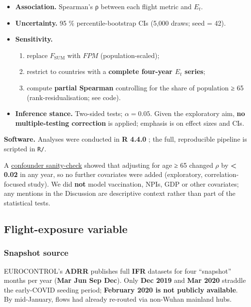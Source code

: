 \documentclass[
  authoryear,
  preprint,
  3p,
  onecolumn]{elsarticle}
\providecommand{\tightlist}{%
  \setlength{\itemsep}{0pt}\setlength{\parskip}{0pt}}\usepackage{longtable,booktabs,array}
\begin{document}
\begin{itemize}
\tightlist
\item
  \textbf{Association.} Spearman's ρ between each flight metric and
  \(E_t\).
\item
  \textbf{Uncertainty.} 95 \% percentile-bootstrap CIs (5,000 draws;
  seed = 42). \citep{diciccio1996}
\item
  \textbf{Sensitivity.}

  \begin{enumerate}
  \def\labelenumi{\arabic{enumi}.}
  \tightlist
  \item
    replace \(F_{\text{SUM}}\) with \(FPM\) (population-scaled);
  \item
    restrict to countries with a \textbf{complete four-year \(E_t\)
    series};
  \item
    compute \textbf{partial Spearman} controlling for the share of
    population ≥ 65 (rank-residualisation; see code).
  \end{enumerate}
\item
  \textbf{Inference stance.} Two-sided tests; \(\alpha=0.05\). Given the
  exploratory aim, \textbf{no multiple-testing correction} is applied;
  emphasis is on effect sizes and CIs.
\end{itemize}

\textbf{Software.} Analyses were conducted in \textbf{R 4.4.0}
\citep{R-base}; the full, reproducible pipeline is scripted in
\texttt{R/}.

A \hyperref[tbl-sensitivity]{confounder sanity-check} showed that
adjusting for age ≥ 65 changed \(\rho\) by \textbf{\textless{} 0.02} in
any year, so no further covariates were added (exploratory,
correlation-focused study). We did \textbf{not} model vaccination, NPIs,
GDP or other covariates; any mentions in the Discussion are descriptive
context rather than part of the statistical tests.

\subsection{Flight-exposure variable}\label{flight-exposure-variable}

\subsubsection{Snapshot source}\label{snapshot-source}

EUROCONTROL's \textbf{ADRR} publishes full \textbf{IFR} datasets for
four ``snapshot'' months per year (\textbf{Mar \textbar{} Jun \textbar{}
Sep \textbar{} Dec}). Only \textbf{Dec 2019} and \textbf{Mar 2020}
straddle the early-COVID seeding period; \textbf{February 2020 is not
publicly available}. By mid-January, flows had already re-routed via
non-Wuhan mainland hubs. \citep{chinazzi2020}
\end{document}
